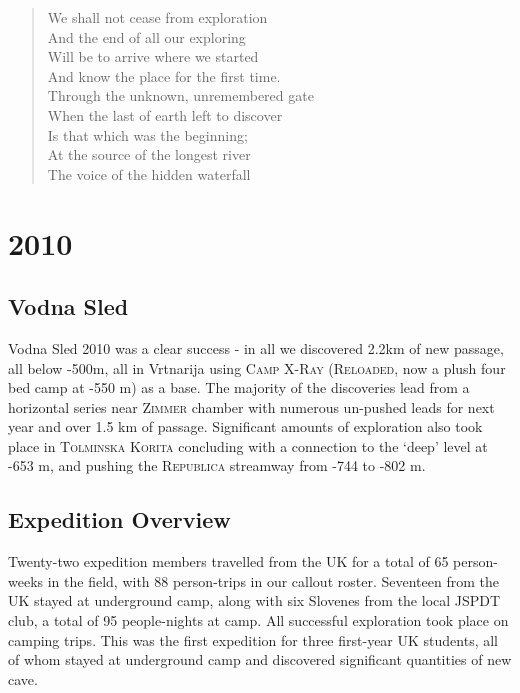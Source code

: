 \begin{verse}
We shall not cease from exploration  \\
And the end of all our exploring  \\
Will be to arrive where we started  \\
And know the place for the first time.  \\
Through the unknown, unremembered gate  \\
When the last of earth left to discover  \\
Is that which was the beginning;  \\
At the source of the longest river  \\
The voice of the hidden waterfall \\
\end{verse}


\chapter{2010}

\section{Vodna Sled}

Vodna Sled 2010 was a clear success - in all we discovered 2.2km of new
passage, all below -500m, all in Vrtnarija using \textsc{Camp
X-Ray} (\textsc{Reloaded}, now a plush four bed camp at -550 m) as a
base. The majority of the discoveries lead from a horizontal series near
\textsc{Zimmer} chamber with numerous un-pushed leads for next year and
over 1.5 km of passage. Significant amounts of exploration also took
place in \textsc{Tolminska Korita} concluding with a connection to the
`deep' level at -653 m, and pushing the \textsc{Republica} streamway
from -744 to -802 m.

\section{Expedition Overview}

Twenty-two expedition members travelled from the UK for a total of 65
person-weeks in the field, with 88 person-trips in our callout roster.
Seventeen from the UK stayed at underground camp, along with six
Slovenes from the local JSPDT club, a total of 95 people-nights at camp.
All successful exploration took place on camping trips. This was the
first expedition for three first-year UK students, all of whom stayed at
underground camp and discovered significant quantities of new cave.

